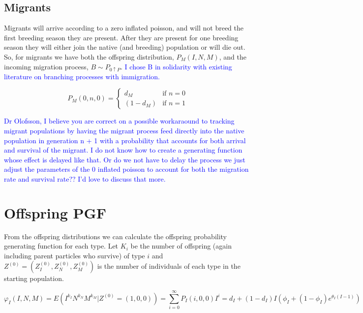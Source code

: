 \documentclass[12pt]{article}
\begin{document}
\subsection{Migrants}

Migrants will arrive according to a zero inflated poisson, and will not breed the first breeding season they are present. After they are present for one breeding season they will either join the native (and breeding) population or will die out. So, for migrants we have both the offspring distribution, $P_M(I,N,M)$, and the incoming migration process, $B \sim P_{0 \uparrow P}$. \textcolor{blue}{I chose B in solidarity with existing literature on branching processes with immigration.}

\begin{equation}
    P_M(0,n,0) =
    \begin{cases}
    d_M & \text{if $n = 0$} \\
    (1-d_M) & \text{if $n = 1$}
    \end{cases}
\end{equation}

\textcolor{blue}{Dr Olofsson, I believe you are correct on a possible workaraound to tracking migrant populations by having the migrant process feed directly into the native population in generation n + 1 with a probability that accounts for both arrival and survival of the migrant. I do not know how to create a generating function whose effect is delayed like that. Or do we not have to delay the process we just adjust the parameters of the 0 inflated poisson to account for both the migration rate and survival rate?? I'd love to discuss that more.}

\section{Offspring PGF}

From the offspring distributions we can calculate the offspring probability generating function for each type. Let $K_i$ be the number of offspring (again including parent particles who survive) of type $i$ and $Z^{(0)} = (Z_I^{(0)},Z_N^{(0)},Z_M^{(0)})$ is the number of individuals of each type in the starting population. 

\begin{equation}
    \varphi_I(I,N,M) = E(I^{k_I} N^{k_N} M^{k_M}|Z^{(0)}=(1,0,0))= \sum \limits_{i = 0} ^ \infty P_I(i,0,0) I^i =d_I +(1-d_I)I(\phi_I + (1-\phi_I)e^{\theta_I (I -1)})
\end{equation}
\end{document}

